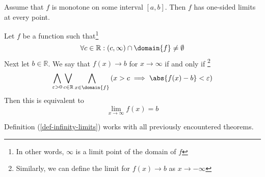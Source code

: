 \begin{thm}\label{thm-monotone-one-sided-limits}
    Assume that $f$ is monotone on some interval $[a,b]$. Then $f$ has one-sided
    limits at every point.
\end{thm}

\begin{definition}\label{def-infinity-limits}
    Let $f$ be a function such that\footnote{In other words, $\infty$ is a limit
    point of the domain of $f$}
    \begin{equation}
        \forall c\in\mathbb{R}: (c,\infty)\cap\domain{f}\neq\emptyset
    \end{equation}
    Next let $b\in\mathbb{R}$. We say that $f(x) \to b$ for $x \to \infty$ if and only if
    \footnote{Similarly, we can define the limit for $f(x) \to b$ as $x \to -\infty$}
    \begin{equation}
        \bigwedge_{\varepsilon>0}\bigvee_{c\in\mathbb{R}}\bigwedge_{x\in\domain{f}}
        \left(x>c \implies \abs{f(x) - b}<\varepsilon\right)
    \end{equation}
    Then this is equivalent to \cite[p.70]{wuest2009}
    \begin{equation}
        \lim_{x \to \infty}f(x)=b
    \end{equation}
\end{definition}

\begin{rem}
    Definition (\ref{def-infinity-limits}) works with all previously encountered theorems.
\end{rem}

